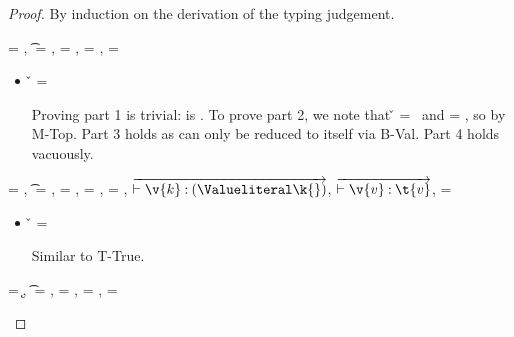 {}

{}

\begin{lemma} \label{appendix:lemma:soundness}
{\soundnesslemmahypothesis}
\begin{proof}
By induction on the derivation of the typing judgement.

\begin{case}[T-True]
  \e{} = \true, \t{} = \True, \thenprop{\prop{}} = \topprop{}, \elseprop{\prop{}} = \botprop{}, \object{} = \emptyobject{}

  \begin{itemize}
    \item[] 
      \begin{subcase}[B-Val]
        \v{} = \true{}

        Proving part 1 is trivial: \object{} is \emptyobject. 
        To prove part 2, we note that \v{} = \true\ 
        and \thenprop{\prop{}} = \topprop{}, so \satisfies{\openv{}}{\thenprop{\prop{}}} by M-Top.
        Part 3 holds as \e{} can only be reduced to itself via B-Val.
        Part 4 holds vacuously.
      \end{subcase}
  \end{itemize}
\end{case}

\begin{case}[T-HMap] \e{} = {},
  \t{} = {\HMapc {\mandatory{}}},
  \thenprop{\prop{}} = {\topprop{}},
  \elseprop{\prop{}} = {\botprop{}},
  \object{} = {\emptyobject{}},
  $\overrightarrow{\judgementtwo {} {\v{k}}{\Value \k{}}}$,
  $\overrightarrow{\judgementtwo {} {\v{v}}{\t{v}}}$,
  \mandatory{} = 

  \begin{itemize}
    \item[]
      \begin{subcase}[B-Val] \v{} = {}

        Similar to T-True.
      \end{subcase}
  \end{itemize}
\end{case}

\begin{case}[T-Kw] \e{} = {\k{}},
  \t{} = {\Value{\k{}}},
  \thenprop{\prop{}} = {\topprop{}},
  \elseprop{\prop{}} = {\botprop{}},
  \object{} = {\emptyobject{}}


\end{case}
\end{proof}
\end{lemma}
